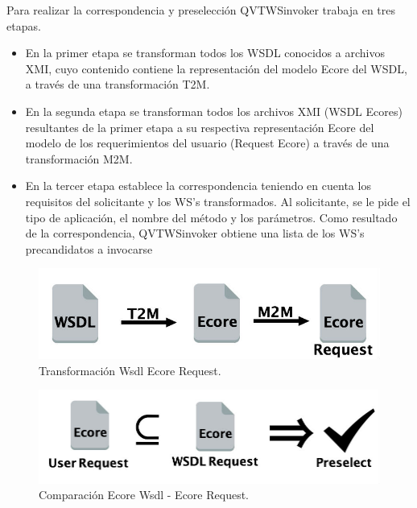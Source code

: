 Para realizar la correspondencia y preselección QVTWSinvoker trabaja en tres etapas.
\begin{itemize}
	\item En la primer etapa se transforman todos los WSDL conocidos a archivos XMI, cuyo contenido contiene la representación del modelo Ecore del WSDL, a través de una transformación T2M.
	
	\item En la segunda etapa se transforman todos los archivos XMI (WSDL Ecores) resultantes de la primer etapa a su respectiva representación Ecore del modelo de los requerimientos del usuario (Request Ecore) a través de una transformación M2M.
	
	\item En la tercer etapa establece la correspondencia teniendo en cuenta los requisitos del solicitante y los WS's transformados. Al solicitante, se le pide el tipo de aplicación, el nombre del método y los parámetros. Como resultado de la correspondencia, QVTWSinvoker obtiene una lista de los WS's precandidatos a invocarse
\end{itemize}

\begin{figure}[!h] 
	\begin{center}
		\includegraphics [scale=0.50]{imagenes/Transformacion_Wsdl_Ecore_Request.jpg}
	\end{center}
	\caption{Transformación Wsdl Ecore Request.}
	\label{fig:Transformación Wsdl Ecore Request}
\end{figure} 

\begin{figure}[!h] 
	\begin{center}
		\includegraphics [scale=0.45]{imagenes/Comparacion_Ecore_Wsdl.jpg}
	\end{center}
	\caption{Comparación Ecore Wsdl - Ecore Request.}
	\label{fig:Comparación Ecore Wsdl - Ecore Request}
\end{figure} 

